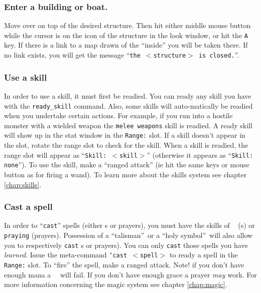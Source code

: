 \subsubsection{Enter a building or boat.}
Move over on top of the desired structure. Then hit either middle mouse
button while the cursor is on the icon of the structure in the look window,
or hit the {\tt A} key. If there is a link to a map drawn of the ``inside''
you will be taken there. If no link exists, you will get the message
``{\tt the $<$structure$>$ is closed.}''. \\

\subsubsection{Use a skill}
In order to use a skill, it must first be readied. You can ready any skill
you have with the {\tt ready\_skill} command. Also, some skills will
auto-matically be readied when you undertake certain
actions. For example, if you run into a hostile monster with a wielded weapon
the {\tt melee weapons} skill is readied. A ready skill will show up in the
stat window in the {\tt Range:} slot. If a skill doesn't appear in the slot, rotate
the range slot to check for the skill. When a skill is readied, the range slot will
appear as ``{\tt Skill: $<$skill$>$}'' (otherwise it appears as
``{\tt Skill: none}'').
To use the skill, make a ``ranged attack'' (ie hit the same keys or
mouse button as for firing a wand). To learn more about the skills
system see chapter \ref{chap:skills}. \\

\subsubsection{Cast a spell}
In order to ``{\tt cast}'' spells (either \incantation s or prayers), you must have
the skills of {\tt \spellcasting\ } (\incantation s) or {\tt praying} (prayers).
Possession
of a ``talisman''\ or a ``holy symbol''\
will also allow you to respectively {\tt cast} \incantation s or prayers). You can
only {\tt cast} those spells you have {\em learned}. Issue the meta-command
{\tt `cast $<$spell$>$} to ready a spell in the {\tt Range:} slot. To
``fire'' the spell, make
a ranged attack. Note! if you don't have enough mana a\ina\ \incantation\
{\em} will fail.
If you don't have enough grace a prayer {\em may} work. For more information
concerning the magic system see chapter \ref{chap:magic}.

